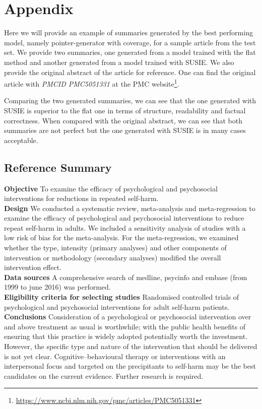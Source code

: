\documentclass[runningheads]{llncs}
\begin{document}
%
%



\section{Appendix}
\small
Here we will provide an example of summaries generated by the best performing model, namely pointer-generator with coverage, for a sample article from the test set. We provide two summaries, one generated from a model trained with the flat method and another generated from a model trained with SUSIE. We also provide the original abstract of the article for reference.  One can find the original article with {\em PMCID PMC5051331} at the PMC website\footnote{\url{https://www.ncbi.nlm.nih.gov/pmc/articles/PMC5051331}}.

Comparing the two generated summaries, we can see that the one generated with SUSIE is superior to the flat one in terms of structure, readability and factual correctness. When compared with the original abstract, we can see that both summaries are not perfect but the one generated with SUSIE is in many cases acceptable. 

\subsection{Reference Summary}
\textbf{Objective} To examine the efficacy of psychological and psychosocial interventions for reductions in repeated self-harm. \\ 
\textbf{Design} We conducted a systematic review, meta-analysis and meta-regression to examine the efficacy of psychological and psychosocial interventions to reduce repeat self-harm in adults. We included a sensitivity analysis of studies with a low risk of bias for the meta-analysis. For the meta-regression, we examined whether the type, intensity (primary analyses) and other components of intervention or methodology (secondary analyses) modified the overall intervention effect. \\
\textbf{Data sources} A comprehensive search of medline, psycinfo and embase (from 1999 to june 2016) was performed. \\
\textbf{Eligibility criteria for selecting studies} Randomised controlled trials of psychological and psychosocial interventions for adult self-harm patients. \\
\textbf{Conclusions} Consideration of a psychological or psychosocial intervention over and above treatment as usual is worthwhile; with the public health benefits of ensuring that this practice is widely adopted potentially worth the investment. However, the specific type and nature of the intervention that should be delivered is not yet clear. Cognitive–behavioural therapy or interventions with an interpersonal focus and targeted on the precipitants to self-harm may be the best candidates on the current evidence. Further research is required.
\end{document}
